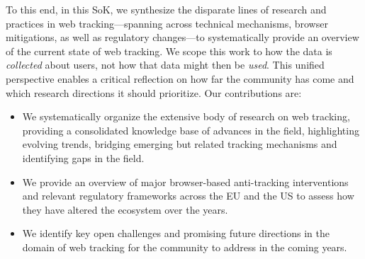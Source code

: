 To this end, in this SoK, we synthesize the disparate lines of research and practices in web tracking---spanning across technical mechanisms, browser mitigations, as well as regulatory changes---to systematically provide an overview of the current state of web tracking. 
%
We scope this work to how the data is \textit{collected} about users, not how that data might then be \textit{used}. 
%
This unified perspective enables a critical reflection on how far the community has come and which research directions it should prioritize.
%
Our contributions are: %
%
\begin{itemize}
    \item We systematically organize the extensive body of research on web tracking, providing a consolidated knowledge base of advances in the field, highlighting evolving trends, bridging emerging but related tracking mechanisms and identifying gaps in the field.
    \item We provide an overview of major browser-based anti-tracking interventions and relevant regulatory frameworks across the EU and the US to assess how they have altered the ecosystem over the years.
    \item We identify key open challenges and promising future directions in the domain of web tracking for the community to address in the coming years.
\end{itemize}